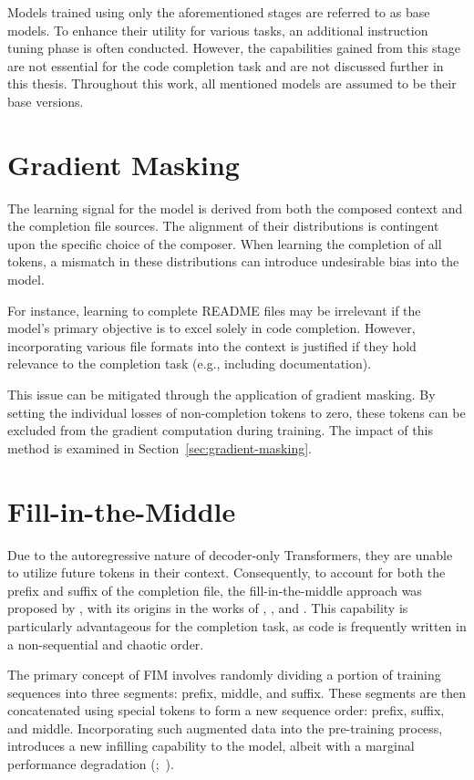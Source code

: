Models trained using only the aforementioned stages are referred to as base models. To enhance their utility for various tasks, an additional instruction tuning phase is often conducted. However, the capabilities gained from this stage are not essential for the code completion task and are not discussed further in this thesis. Throughout this work, all mentioned models are assumed to be their base versions.

\section{Gradient Masking}

The learning signal for the model is derived from both the composed context and the completion file sources. The alignment of their distributions is contingent upon the specific choice of the composer. When learning the completion of all tokens, a mismatch in these distributions can introduce undesirable bias into the model.

For instance, learning to complete README files may be irrelevant if the model's primary objective is to excel solely in code completion. However, incorporating various file formats into the context is justified if they hold relevance to the completion task (e.g., including documentation).

This issue can be mitigated through the application of gradient masking. By setting the individual losses of non-completion tokens to zero, these tokens can be excluded from the gradient computation during training. The impact of this method is examined in Section~\ref{sec:gradient-masking}.

\section{Fill-in-the-Middle}\label{sec:fill-in-the-middle}

Due to the autoregressive nature of decoder-only Transformers, they are unable to utilize future tokens in their context. Consequently, to account for both the prefix and suffix of the completion file, the fill-in-the-middle approach was proposed by \citet{bavarian2022}, with its origins in the works of \citet{donahue2020}, \citet{aghajanyan2022}, and \citet{fried2022}. This capability is particularly advantageous for the completion task, as code is frequently written in a non-sequential and chaotic order.

The primary concept of FIM involves randomly dividing a portion of training sequences into three segments: prefix, middle, and suffix. These segments are then concatenated using special tokens to form a new sequence order: prefix, suffix, and middle. Incorporating such augmented data into the pre-training process, introduces a new infilling capability to the model, albeit with a marginal performance degradation (\cite{allal2023};~\cite{rozière2023}).

